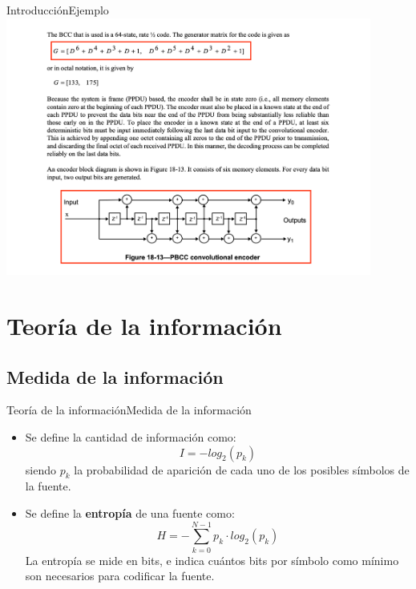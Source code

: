 \documentclass[10pt,compress]{beamer} %
\begin{document}
\begin{frame}{Introducción}{Ejemplo}
  \centering \includegraphics[width=0.9\textwidth]{./Figuras/Wifi5.pdf}
\end{frame}

\section{Teoría de la información}
\subsection{Medida de la información}
\begin{frame}{Teoría de la información}{Medida de la información}
    \begin{itemize}
		\item Se define la cantidad de información como:
		\begin{displaymath}
        I = -log_2(p_k)
    \end{displaymath}
      siendo $p_k$ la probabilidad de aparición de cada uno de los posibles símbolos de la fuente. 
    
    \item Se define la {\bf entropía} de una fuente como:
    \begin{displaymath}
      H = - \sum_{k=0}^{N-1}p_k \cdot  log_2(p_k)
    \end{displaymath}
    La entropía se mide en bits, e indica cuántos bits por símbolo como mínimo son necesarios para codificar la fuente.
	\end{itemize}
\end{frame}
\end{document}
